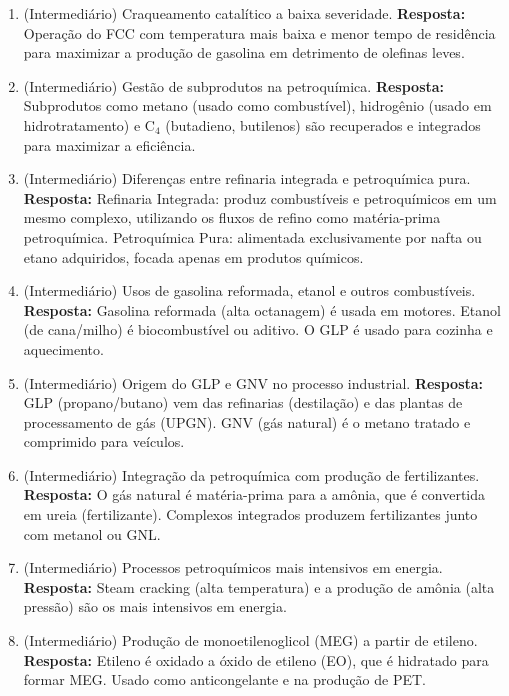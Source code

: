 \documentclass[11pt,a4paper]{article}
\begin{document}
\begin{enumerate}
  \item (Intermediário) Craqueamento catalítico a baixa severidade.
  \textbf{Resposta:} Operação do FCC com temperatura mais baixa e menor tempo de residência para maximizar a produção de gasolina em detrimento de olefinas leves.

  \item (Intermediário) Gestão de subprodutos na petroquímica.
  \textbf{Resposta:} Subprodutos como metano (usado como combustível), hidrogênio (usado em hidrotratamento) e C$_4$ (butadieno, butilenos) são recuperados e integrados para maximizar a eficiência.

  \item (Intermediário) Diferenças entre refinaria integrada e petroquímica pura.
  \textbf{Resposta:} Refinaria Integrada: produz combustíveis e petroquímicos em um mesmo complexo, utilizando os fluxos de refino como matéria-prima petroquímica. Petroquímica Pura: alimentada exclusivamente por nafta ou etano adquiridos, focada apenas em produtos químicos.

  \item (Intermediário) Usos de gasolina reformada, etanol e outros combustíveis.
  \textbf{Resposta:} Gasolina reformada (alta octanagem) é usada em motores. Etanol (de cana/milho) é biocombustível ou aditivo. O GLP é usado para cozinha e aquecimento.

  \item (Intermediário) Origem do GLP e GNV no processo industrial.
  \textbf{Resposta:} GLP (propano/butano) vem das refinarias (destilação) e das plantas de processamento de gás (UPGN). GNV (gás natural) é o metano tratado e comprimido para veículos.

  \item (Intermediário) Integração da petroquímica com produção de fertilizantes.
  \textbf{Resposta:} O gás natural é matéria-prima para a amônia, que é convertida em ureia (fertilizante). Complexos integrados produzem fertilizantes junto com metanol ou GNL.

  \item (Intermediário) Processos petroquímicos mais intensivos em energia.
  \textbf{Resposta:} Steam cracking (alta temperatura) e a produção de amônia (alta pressão) são os mais intensivos em energia.

  \item (Intermediário) Produção de monoetilenoglicol (MEG) a partir de etileno.
  \textbf{Resposta:} Etileno é oxidado a óxido de etileno (EO), que é hidratado para formar MEG. Usado como anticongelante e na produção de PET.


\end{enumerate}
\end{document}
